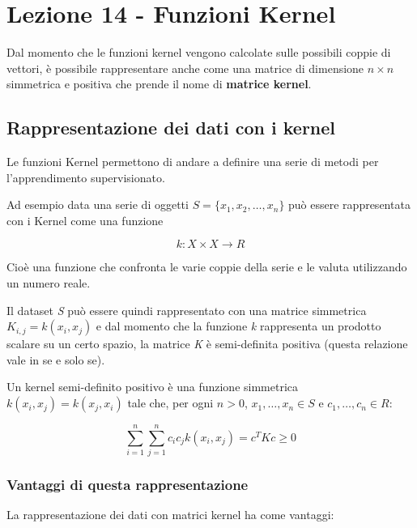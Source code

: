 \section{Lezione 14 - Funzioni Kernel} \label{lezione-14---funzioni-kernel}

Dal momento che le funzioni kernel vengono calcolate sulle possibili coppie di vettori, è possibile rappresentare anche come una matrice di dimensione $n \times n$ simmetrica e positiva che prende il nome di \textbf{matrice kernel}.

\subsection{Rappresentazione dei dati con i kernel}\label{rappresentazione-dei-dati-con-i-kernel}

Le funzioni Kernel permettono di andare a definire una serie di metodi
per l'apprendimento supervisionato.

Ad esempio data una serie di oggetti $S = \{x_1,x_2, \ldots , x_n\}$ può
essere rappresentata con i Kernel come una funzione

$$
k : X \times X \rightarrow R
$$

Cioè una funzione che confronta le varie coppie della serie e le valuta
utilizzando un numero reale.

Il dataset \emph{S} può essere quindi rappresentato con una matrice
simmetrica $K_{i,j} = k(x_i,x_j)$ e dal momento che la funzione
\emph{k} rappresenta un prodotto scalare su un certo spazio, la matrice
\emph{K} è semi-definita positiva (questa relazione vale in se e solo
se).

Un kernel semi-definito positivo è una funzione simmetrica $k(x_i,x_j) = k(x_j, x_i)$ tale che, per ogni $n > 0$, $x_1, \ldots, x_n \in S$ e $c_1, \ldots, c_n \in R$:

$$ \sum\limits_{i=1}^n \sum\limits_{j=1}^n c_i c_j k(x_i,x_j) = c^T K c \geq 0$$

\subsubsection{Vantaggi di questa rappresentazione}\label{vantaggi-di-questa-rappresentazione}

La rappresentazione dei dati con matrici kernel ha come vantaggi:


